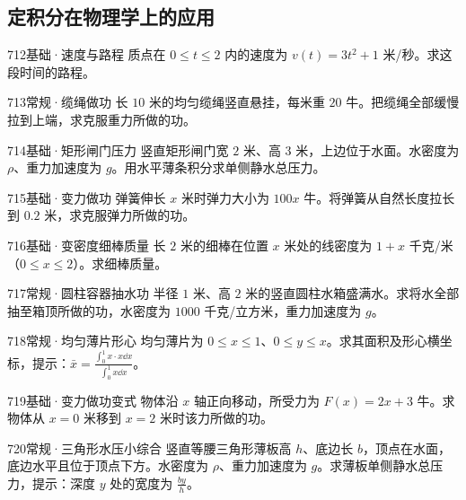 \subsection{定积分在物理学上的应用}
\begin{exercise}{712}{基础·速度与路程}
质点在 $0\le t\le2$ 内的速度为 $v(t)=3t^2+1$ 米/秒。求这段时间的路程。
\end{exercise}
\begin{exercise}{713}{常规·缆绳做功}
长 $10$ 米的均匀缆绳竖直悬挂，每米重 $20$ 牛。把缆绳全部缓慢拉到上端，求克服重力所做的功。
\end{exercise}
\begin{exercise}{714}{基础·矩形闸门压力}
竖直矩形闸门宽 $2$ 米、高 $3$ 米，上边位于水面。水密度为 $\rho$、重力加速度为 $g$。用水平薄条积分求单侧静水总压力。
\end{exercise}
\begin{exercise}{715}{基础·变力做功}
弹簧伸长 $x$ 米时弹力大小为 $100x$ 牛。将弹簧从自然长度拉长到 $0.2$ 米，求克服弹力所做的功。
\end{exercise}
\begin{exercise}{716}{基础·变密度细棒质量}
长 $2$ 米的细棒在位置 $x$ 米处的线密度为 $1+x$ 千克/米（$0\le x\le2$）。求细棒质量。
\end{exercise}
\begin{exercise}{717}{常规·圆柱容器抽水功}
半径 $1$ 米、高 $2$ 米的竖直圆柱水箱盛满水。求将水全部抽至箱顶所做的功，水密度为 $1000$ 千克/立方米，重力加速度为 $g$。
\end{exercise}
\begin{exercise}{718}{常规·均匀薄片形心}
均匀薄片为 $0\le x\le1$、$0\le y\le x$。求其面积及形心横坐标，提示：$\bar x=\frac{\int_0^1x\cdot x\dd x}{\int_0^1x\dd x}$。
\end{exercise}
\begin{exercise}{719}{基础·变力做功变式}
物体沿 $x$ 轴正向移动，所受力为 $F(x)=2x+3$ 牛。求物体从 $x=0$ 米移到 $x=2$ 米时该力所做的功。
\end{exercise}
\begin{exercise}{720}{常规·三角形水压小综合}
竖直等腰三角形薄板高 $h$、底边长 $b$，顶点在水面，底边水平且位于顶点下方。水密度为 $\rho$、重力加速度为 $g$。求薄板单侧静水总压力，提示：深度 $y$ 处的宽度为 $\frac{by}{h}$。
\end{exercise}
